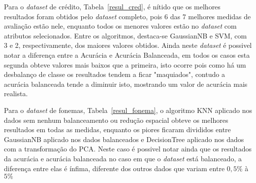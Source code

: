 Para o \textit{dataset} de crédito, Tabela~\ref{resul_cred}, é nítido que os melhores resultados foram obtidos pelo \textit{dataset} completo, pois 6 das 7 melhores medidas de avaliação estão nele, enquanto todos os menores valores estão no \textit{dataset} com atributos selecionados. Entre os algoritmos, destaca-se GaussianNB e SVM, com 3 e 2, respectivamente, dos maiores valores obtidos. Ainda neste \textit{dataset} é possivel notar a diferença entre a Acurácia e Acurácia Balanceada, em todos os casos esta segunda obteve valores mais baixos que a primeira, isto ocorre pois como há um desbalanço de classe os resultados tendem a ficar "maquiados", contudo a acurácia balanceada tende a diminuir isto, mostrando um valor de acurácia mais realista.

Para o \textit{dataset} de fonemas, Tabela~\ref{resul_fonema}, o algoritmo KNN aplicado nos dados sem nenhum balanceamento ou redução espacial obteve os melhores resultados em todas as medidas, enquanto os piores ficaram divididos entre GaussianNB aplicado nos dados balanceados e DecisionTree aplicado nos dados com a transformação do PCA. Neste caso é possivel notar ainda que os resultados da acurácia e acurácia balanceada no caso em que o \textit{dataset} está balanceado, a diferença entre elas é ínfima, diferente dos outros dados que variam entre $0,5\%$ à $5\%$